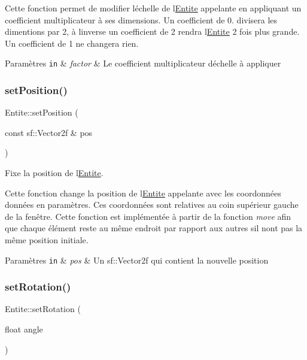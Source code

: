 Cette fonction permet de modifier l\textquotesingle{}échelle de l\textquotesingle{}\hyperlink{class_entite}{Entite} appelante en appliquant un coefficient multiplicateur à ses dimensions. Un coefficient de 0. divisera les dimentions par 2, à l\textquotesingle{}inverse un coefficient de 2 rendra l\textquotesingle{}\hyperlink{class_entite}{Entite} 2 fois plus grande. Un coefficient de 1 ne changera rien. 
\begin{DoxyParams}[1]{Paramètres}
\mbox{\tt in}  & {\em factor} & Le coefficient multiplicateur d\textquotesingle{}échelle à appliquer \\
\hline
\end{DoxyParams}
\mbox{\label{class_entite_aa7fe4a7ebd8eb4c80ef9fdb7d97f2dad}} 
\subsubsection{\texorpdfstring{set\+Position()}{setPosition()}}
{\footnotesize\ttfamily Entite\+::set\+Position (\begin{DoxyParamCaption}\item[{const sf\+::\+Vector2f \&}]{pos }\end{DoxyParamCaption})}



Fixe la position de l\textquotesingle{}\hyperlink{class_entite}{Entite}. 

Cette fonction change la position de l\textquotesingle{}\hyperlink{class_entite}{Entite} appelante avec les coordonnées données en paramètres. Ces coordonnées sont relatives au coin supérieur gauche de la fenêtre. Cette fonction est implémentée à partir de la fonction {\itshape move} afin que chaque élément reste au même endroit par rapport aux autres s\textquotesingle{}il n\textquotesingle{}ont pas la même position initiale. 
\begin{DoxyParams}[1]{Paramètres}
\mbox{\tt in}  & {\em pos} & Un {\ttfamily sf\+::\+Vector2f} qui contient la nouvelle position \\
\hline
\end{DoxyParams}
\mbox{\label{class_entite_a8623ac815e34b553098f45696ea8918b}} 
\subsubsection{\texorpdfstring{set\+Rotation()}{setRotation()}}
{\footnotesize\ttfamily Entite\+::set\+Rotation (\begin{DoxyParamCaption}\item[{float}]{angle }\end{DoxyParamCaption})}



